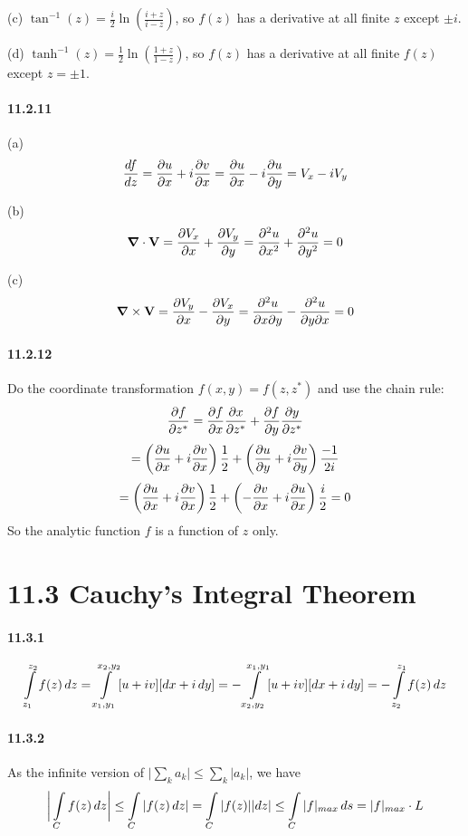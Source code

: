 \documentclass[a4paper]{article}
\begin{document}
(c) $\tan^{-1}(z)=\frac{i}{2}\ln\left(\frac{i+z}{i-z}\right)$, so $f(z)$ has a derivative at all finite $z$ except $\pm i$.
\medskip

(d) $\tanh^{-1}(z)=\frac{1}{2}\ln\left(\frac{1+z}{1-z}\right)$, so $f(z)$ has a derivative at all finite $f(z)$ except $z=\pm1$.

\paragraph{11.2.11}
(a)
\[
\frac{df}{dz}=\frac{\partial u}{\partial x}+i\frac{\partial v}{\partial x}=\frac{\partial u}{\partial x}-i\frac{\partial u}{\partial y}=V_x-iV_y
\]

(b) 
\[
\boldsymbol{\nabla}\cdot\mathbf{V}=\frac{\partial V_x}{\partial x}+\frac{\partial V_y}{\partial y}=\frac{\partial^2u}{\partial x^2}+\frac{\partial^2u}{\partial y^2}=0
\]

(c)
\[
\boldsymbol{\nabla}\times\mathbf{V}=\frac{\partial V_y}{\partial x}-\frac{\partial V_x}{\partial y}=\frac{\partial^2u}{\partial x\partial y}-\frac{\partial^2u}{\partial y\partial x}=0
\]

\paragraph{11.2.12}
Do the coordinate transformation $f(x,y)=f(z,z^*)$ and use the chain rule:
\[
\frac{\partial f}{\partial z^*}=\frac{\partial f}{\partial x}\frac{\partial x}{\partial z^*}+\frac{\partial f}{\partial y}\frac{\partial y}{\partial z^*}\]
\[
=\left(\frac{\partial u}{\partial x}+i\frac{\partial v}{\partial x}\right)\frac{1}{2}+\left(\frac{\partial u}{\partial y}+i\frac{\partial v}{\partial y}\right)\frac{-1}{2i}
\]
\[
=\left(\frac{\partial u}{\partial x}+i\frac{\partial v}{\partial x}\right)\frac{1}{2}+\left(-\frac{\partial v}{\partial x}+i\frac{\partial u}{\partial x}\right)\frac{i}{2}=0
\]
So the analytic function $f$ is a function of $z$ only.

\section*{11.3 Cauchy’s Integral Theorem}

\paragraph{11.3.1}
\[
\int\displaylimits_{z_1}^{z_2}f(z)\,dz=\int\displaylimits_{x_1,y_1}^{x_2,y_2}[u+iv][dx+i\,dy]=-\int\displaylimits_{x_2,y_2}^{x_1,y_1}[u+iv][dx+i\,dy]=-\int\displaylimits_{z_2}^{z_1}f(z)\,dz
\]

\paragraph{11.3.2}
As the infinite version of $\big|\sum_k a_k\big|\leq\sum_k|a_k|$, we have
\[
\bigg|\int\displaylimits_Cf(z)\,dz\bigg|\leq\int\displaylimits_C|f(z)\,dz|=\int\displaylimits_C|f(z)||dz|\leq\int\displaylimits_C|f|_{max}\,ds=|f|_{max}\cdot L
\]
\end{document}
